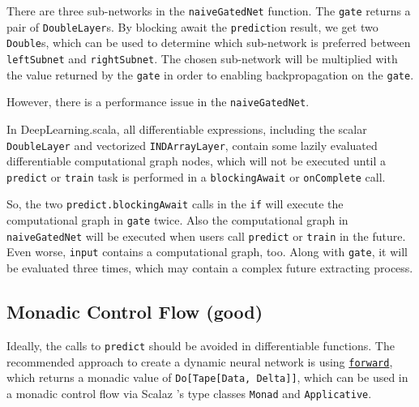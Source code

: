 There are three sub-networks in the \lstinline{naiveGatedNet} function. The \lstinline{gate} returns a pair of \lstinline{DoubleLayer}s. By blocking await the \lstinline{predict}ion result, we get two \lstinline{Double}s, which can be used to determine which sub-network is preferred between \lstinline{leftSubnet} and \lstinline{rightSubnet}. The chosen sub-network will be multiplied with the value returned by the \lstinline{gate} in order to enabling backpropagation on the \lstinline{gate}.

However, there is a performance issue in the \lstinline{naiveGatedNet}.

In DeepLearning.scala, all differentiable expressions, including the scalar \lstinline{DoubleLayer} and vectorized \lstinline{INDArrayLayer}, contain some lazily evaluated differentiable \gls{computational graph} nodes, which will not be executed until a \lstinline{predict} or \lstinline{train} task is performed in a \lstinline{blockingAwait} or \lstinline{onComplete} call.

So, the two \lstinline{predict.blockingAwait} calls in the \lstinline{if} will execute the \gls{computational graph} in \lstinline{gate} twice. Also the \gls{computational graph} in \lstinline{naiveGatedNet} will be executed when users call \lstinline{predict} or \lstinline{train} in the future. Even worse, \lstinline{input} contains a \gls{computational graph}, too. Along with \lstinline{gate}, it will be evaluated three times, which may contain a complex future extracting process.

\subsection{Monadic Control Flow (good)}
\label{monadic}

Ideally, the calls to \lstinline{predict} should be avoided in differentiable functions. The recommended approach to create a dynamic neural network is using \href{https://javadoc.io/page/com.thoughtworks.deeplearning/deeplearning_2.11/latest/com/thoughtworks/deeplearning/DeepLearning.html#forward(differentiable:Differentiable):com.thoughtworks.raii.asynchronous.Do[com.thoughtworks.deeplearning.DeepLearning.Tape[DeepLearning.this.Data,DeepLearning.this.Delta]]}{\lstinline{forward}}, which returns a monadic value of \lstinline{Do[Tape[Data, Delta]]}, which can be used in a monadic control flow via Scalaz \cite{kenji2017scalaz}'s type classes \cite{oliveira2010type} \lstinline{Monad} and \lstinline{Applicative}.

